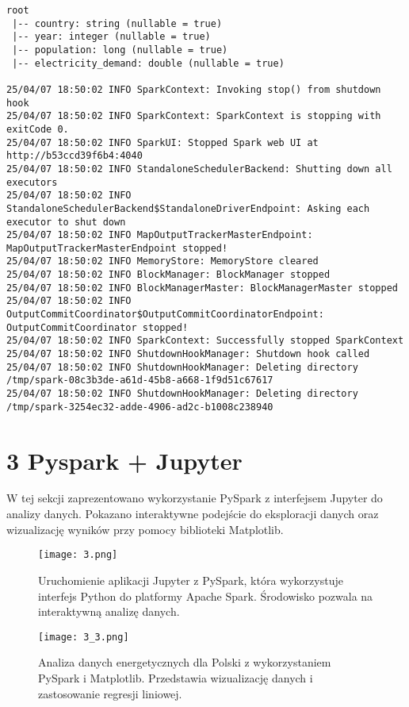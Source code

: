 \documentclass{article}
\begin{document}
\begin{verbatim}
root
 |-- country: string (nullable = true)
 |-- year: integer (nullable = true)
 |-- population: long (nullable = true)
 |-- electricity_demand: double (nullable = true)

25/04/07 18:50:02 INFO SparkContext: Invoking stop() from shutdown hook
25/04/07 18:50:02 INFO SparkContext: SparkContext is stopping with exitCode 0.
25/04/07 18:50:02 INFO SparkUI: Stopped Spark web UI at http://b53ccd39f6b4:4040
25/04/07 18:50:02 INFO StandaloneSchedulerBackend: Shutting down all executors
25/04/07 18:50:02 INFO StandaloneSchedulerBackend$StandaloneDriverEndpoint: Asking each executor to shut down
25/04/07 18:50:02 INFO MapOutputTrackerMasterEndpoint: MapOutputTrackerMasterEndpoint stopped!
25/04/07 18:50:02 INFO MemoryStore: MemoryStore cleared
25/04/07 18:50:02 INFO BlockManager: BlockManager stopped
25/04/07 18:50:02 INFO BlockManagerMaster: BlockManagerMaster stopped
25/04/07 18:50:02 INFO OutputCommitCoordinator$OutputCommitCoordinatorEndpoint: OutputCommitCoordinator stopped!
25/04/07 18:50:02 INFO SparkContext: Successfully stopped SparkContext
25/04/07 18:50:02 INFO ShutdownHookManager: Shutdown hook called
25/04/07 18:50:02 INFO ShutdownHookManager: Deleting directory /tmp/spark-08c3b3de-a61d-45b8-a668-1f9d51c67617
25/04/07 18:50:02 INFO ShutdownHookManager: Deleting directory /tmp/spark-3254ec32-adde-4906-ad2c-b1008c238940
\end{verbatim}

\section{3 Pyspark + Jupyter}
W tej sekcji zaprezentowano wykorzystanie PySpark z interfejsem Jupyter do analizy danych. Pokazano interaktywne podejście do eksploracji danych oraz wizualizację wyników przy pomocy biblioteki Matplotlib.

\begin{figure}
    \centering
    \texttt{[image: 3.png]}
    \caption{Uruchomienie aplikacji Jupyter z PySpark, która wykorzystuje interfejs Python do platformy Apache Spark. Środowisko pozwala na interaktywną analizę danych.}
    \label{fig:enter-label}
\end{figure}


\begin{figure}
    \centering
    \texttt{[image: 3\_3.png]}
    \caption{Analiza danych energetycznych dla Polski z wykorzystaniem PySpark i Matplotlib. Przedstawia wizualizację danych i zastosowanie regresji liniowej.}
    \label{fig:enter-label}
\end{figure}
\end{document}
